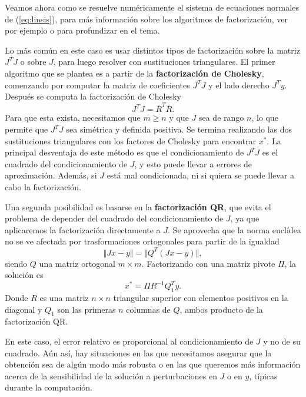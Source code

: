 \documentclass[11pt,a4paper]{book}
\theoremstyle{definition}
\theoremstyle{remark}
\begin{document}
Veamos ahora como se resuelve numéricamente el sistema de ecuaciones normales de (\ref{eq:linsis}), para más información sobre los algoritmos de factorización, ver por ejemplo \cite{Trefethen1997-ek} o \cite{Golub2013-li} para profundizar en el tema.

Lo más común en este caso es usar distintos tipos de factorización sobre la matriz $J^TJ$ o sobre $J$, para luego resolver con sustituciones triangulares.
El primer algoritmo que se plantea es a partir de la \textbf{factorización de Cholesky}, comenzando por computar la matriz de coeficientes $J^TJ$ y el lado derecho $J^Ty$. Después se computa la factorización de Cholesky
\begin{equation}
	J^TJ = \bar R^T\bar R.
\end{equation}
Para que esta exista, necesitamos que $m \geq n$ y que $J$ sea de rango $n$,
lo que permite que $J^TJ$ sea simétrica y definida positiva.
Se termina realizando las dos sustituciones triangulares con los factores de Cholesky para encontrar $x^*$.
La principal desventaja de este método es que el condicionamiento de $J^TJ$ es el cuadrado del condicionamiento de $J$, y esto puede llevar a errores de aproximación.
Además, si $J$ está mal condicionada, ni si quiera se puede llevar a cabo la factorización.

Una segunda posibilidad es basarse en la \textbf{factorización QR}, que evita el problema de depender del cuadrado del condicionamiento de $J$, ya que aplicaremos la factorización directamente a $J$. Se aprovecha que la norma euclídea no se ve afectada por trasformaciones ortogonales para partir de la igualdad
\begin{equation}
	\Vert Jx- y \Vert = \Vert Q^T(Jx-y) \Vert, 
\end{equation}
siendo $Q$ una matriz ortogonal $m \times m$. Factorizando con una matriz pivote $\Pi$, la solución es
\begin{equation}
	x^* = \Pi R^{-1}Q_1^Ty.
\end{equation}
Donde $R$ es una matriz $n \times n$ triangular superior con elementos positivos en la diagonal y $Q_1$ son las primeras $n$ columnas de $Q$, ambos producto de la factorización QR.

En este caso, el error relativo es proporcional al condicionamiento de $J$ y no de su cuadrado.
Aún así, hay situaciones en las que necesitamos asegurar que la obtención sea de algún modo más robusta
o en las que queremos más información acerca de la sensibilidad de la solución a perturbaciones en $J$
o en $y$, típicas durante la computación.
\end{document}

